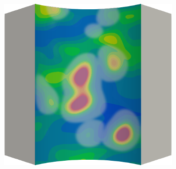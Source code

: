 \begin{frame}
\begin{columns}[T]
\begin{column}{0.6\textwidth}
\begin{figure}
{\begin{subfigure}{0.19\textwidth}
          \end{subfigure}
          \hspace{0.06\textwidth}
          \begin{subfigure}{0.19\textwidth}
            \centering
            \includegraphics[width=\textwidth]{Chapter345/figures/ep.0021}
          \end{subfigure}
        }
        

\end{figure}
\end{column}
\end{columns}
\end{frame}
